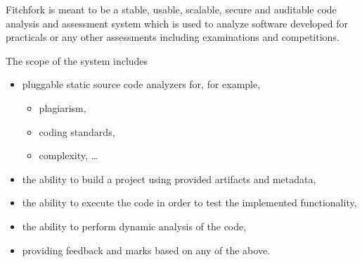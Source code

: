 
Fitchfork is meant to be a stable, usable, scalable, secure and auditable code analysis and assessment system which is used to analyze software developed for practicals or any other assessments including examinations and competitions.

The scope of the system includes
\begin{itemize}
  \item pluggable static source code analyzers for, for example,
    \begin{itemize}
      \item plagiarism,
      \item coding standards,
      \item complexity, \ldots
    \end{itemize}
  \item the ability to build a project using provided artifacts and metadata,
  \item the ability to execute the code in order to test the implemented functionality,
  \item the ability to perform dynamic analysis of the code, 
  \item providing feedback and marks based on any of the above.    
\end{itemize}